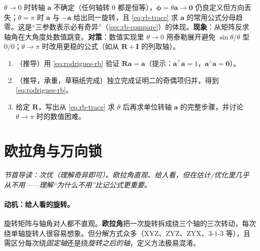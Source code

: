 \begin{pitfall}[思维陷阱：轴角在 $\theta=0,\pi$ 附近的退化]
$\theta\to0$ 时转轴 $\mathbf{a}$ 不确定（任何轴转 $0$ 都是恒等），$\boldsymbol{\phi}=\theta\mathbf{a}\to\mathbf{0}$ 仍良定义但方向丢失；$\theta=\pi$ 时 $\mathbf{a}$ 与 $-\mathbf{a}$ 给出同一旋转，且 \cref{eq:rb-trace} 求 $\mathbf{a}$ 的常用公式分母趋零。这是“三参数表示必有奇异”（\cref{sec:rb-compare}）的体现。\textbf{现象}：从矩阵反求轴角在大角度处数值跳变。\textbf{对策}：数值实现里 $\theta\to0$ 用泰勒展开避免 $\sin\theta/\theta$ 型 $0/0$；$\theta\to\pi$ 时改用更稳的公式（如从 $\mathbf{R}+\mathbf{I}$ 的列取轴）。
\end{pitfall}

\begin{practice}
\begin{enumerate}
  \item （推导）用 \cref{eq:rodrigues-rb} 验证 $\mathbf{R}\mathbf{a}=\mathbf{a}$（提示：$\mathbf{a}^\top\mathbf{a}=1$，$\mathbf{a}^\wedge\mathbf{a}=\mathbf{0}$）。
  \item （推导，承重，草稿纸完成）独立完成证明二的奇偶项归并，得到 \cref{eq:rodrigues-rb}。
  \item 给定 $\mathbf{R}$，写出从 \cref{eq:rb-trace} 求 $\theta$ 后再求单位转轴 $\mathbf{a}$ 的完整步骤，并讨论 $\theta\to\pi$ 时的数值困难。
\end{enumerate}
\end{practice}

\section{欧拉角与万向锁}
\label{sec:rb-euler}
\noindent\emph{节首导读：次优（理解奇异即可）。欧拉角直观、给人看，但在估计/优化里几乎从不用——理解“为什么不用”比记公式更重要。}

\paragraph{动机：给人看的旋转。}旋转矩阵与轴角对人都不直观。\textbf{欧拉角}把一次旋转拆成绕三个轴的三次转动，每次绕单轴旋转人很容易想象\cite{gaoxiang2019slam14}。但分解方式众多（XYZ、ZYZ、ZYX、$3$-$1$-$3$ 等），且需区分每次绕\emph{固定轴}还是绕\emph{旋转之后的轴}，定义方法极易混淆。


